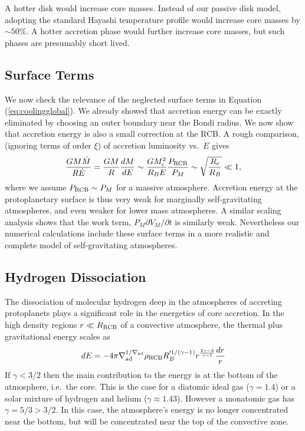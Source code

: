 \documentclass[apj]{emulateapj}
\newcommand{\p}{\partial}
\newcommand{\Eq}[1]{Equation\,(\ref{#1})}
\newcommand{\co}{_{\rm c}}
\newcommand{\cb}{_{\rm RCB}}
\newcommand{\surf}{_M}
\begin{document}
A hotter disk would increase core masses.  Instead of our passive disk model, adopting the standard Hayashi temperature profile would increase core masses by $\sim 50\%$.  A hotter accretion phase would further increase core masses, but such phases are presumably short lived.

\subsection{Surface Terms}
We now check the relevance of the neglected surface terms in \Eq{eq:coolingglobal}.  We already showed that accretion energy can be exactly eliminated by choosing an outer boundary near the Bondi radius.   We now show that accretion energy is also a small correction at the RCB.   A rough comparison, (ignoring terms of order $\xi$) of  accretion luminosity vs.\ $\dot{E}$ gives
\begin{equation}
{G M \dot{M} \over R \dot{E}} = {G M  \over R}{dM \over dE} \sim {G M\co^2 \over R_B E}{P\cb \over P_M} \sim \sqrt{R\co \over R_B} \ll 1,
\end{equation} 
where we assume $P\cb \sim P_M$  for a massive atmosphere.  Accretion energy at the protoplanetary surface is thus very weak for marginally self-gravitating atmospheres, and even weaker for lower mass atmospheres.  A similar scaling analysis shows that the work term, $P\surf \p V\surf/\p t$ is similarly weak.  Nevertheless our numerical calculations include these surface terms in a more realistic and complete model of self-gravitating atmospheres.


\subsection{Hydrogen Dissociation}
The dissociation of molecular hydrogen deep in the atmospheres of accreting protoplanets plays a significant role in the energetics of core accretion.  In the high density regions $r  \ll R\cb$ of a convective atmosphere, the thermal plus gravitational energy scales as
\begin{equation}
dE = -4 \pi \nabla_{\rm ad}^{1/\nabla_{\rm ad}} \rho\cb R_B'^{1/(\gamma-1)} r^{\frac{2\gamma - 3}{\gamma - 1}} {dr \over r}
\end{equation} 
If $\gamma < 3/2$ then the main contribution to the energy is at the bottom of the atmosphere, i.e.\ the core.  This is the case for a diatomic ideal gas ($\gamma = 1.4$) or a solar mixture of hydrogen and helium ($\gamma \approx 1.43$).  However a monatomic gas has $\gamma = 5/3 > 3/2$.  In this case, the atmosphere's energy is no longer concentrated near the bottom, but will be concentrated near the top of the convective zone.
\end{document}
